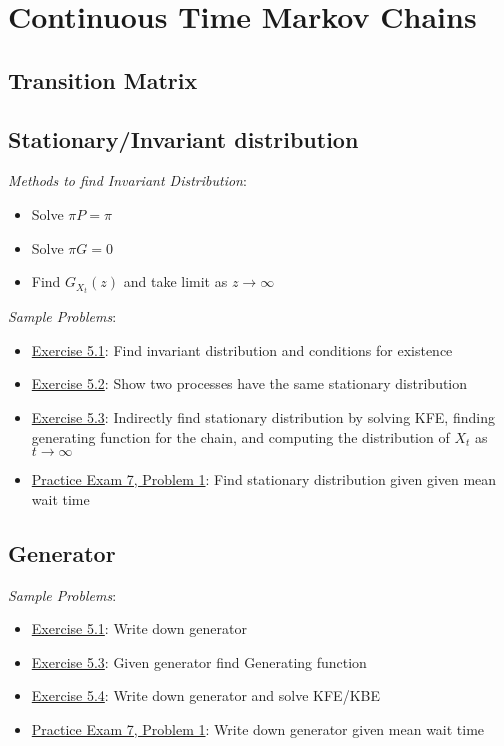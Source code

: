 \documentclass[12pt]{article}
\begin{document}
\pagebreak
\section{Continuous Time Markov Chains}

\subsection{Transition Matrix}


\subsection{Stationary/Invariant distribution}
\textit{Methods to find Invariant Distribution}:
\begin{itemize}[nolistsep]
    \item Solve \( \pi P = \pi \)
    \item Solve \( \pi G = 0 \)
    \item Find \( G_{X_t}(z) \) and take limit as \( z\to\infty \) 
\end{itemize}

\textit{Sample Problems}: 
\begin{itemize}[nolistsep]
    \item \hyperref[Exercise 5.1]{Exercise 5.1}: Find invariant distribution and conditions for existence
    \item \hyperref[Exercise 5.2]{Exercise 5.2}: Show two processes have the same stationary distribution 
    \item \hyperref[Exercise 5.3]{Exercise 5.3}: Indirectly find stationary distribution by solving KFE, finding generating function for the chain, and computing the distribution of \( X_t \) as \( t\to\infty \)
    \item \hyperref[Practice Exam 7, Problem 1]{Practice Exam 7, Problem 1}: Find stationary distribution given given mean wait time
\end{itemize}

\subsection{Generator}
\textit{Sample Problems}: 
\begin{itemize}[nolistsep]
    \item \hyperref[Exercise 5.1]{Exercise 5.1}: Write down generator
    \item \hyperref[Exercise 5.3]{Exercise 5.3}: Given generator find Generating function
    \item \hyperref[Exercise 5.4]{Exercise 5.4}: Write down generator and solve KFE/KBE
    \item \hyperref[Practice Exam 7, Problem 1]{Practice Exam 7, Problem 1}: Write down generator given mean wait time
\end{itemize}
\end{document}
